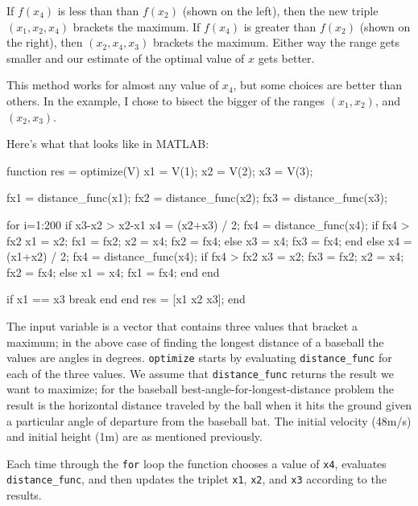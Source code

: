 \documentclass[
]{book}
\numberwithin{Answer}{chapter}
\numberwithin{Exercise}{chapter}
\begin{document}
If $f(x_4)$ is less than than $f(x_2)$ (shown on the left), then the
new triple $(x_1, x_2, x_4)$ brackets the maximum.  If $f(x_4)$ is
greater than $f(x_2)$ (shown on the right), then $(x_2, x_4, x_3)$
brackets the maximum.  Either way the range gets smaller and our
estimate of the optimal value of $x$ gets better.

This method works for almost any value of $x_4$, but some choices
are better than others.  In the example, I chose to bisect the
bigger of the ranges $(x_1, x_2)$, and $(x_2, x_3)$.

Here's what that looks like in MATLAB:

\begin{code}
function res = optimize(V)
    x1 = V(1);
    x2 = V(2);
    x3 = V(3);

    fx1 = distance_func(x1);
    fx2 = distance_func(x2);
    fx3 = distance_func(x3);

    for i=1:200
        if x3-x2 > x2-x1
            x4 = (x2+x3) / 2;
            fx4 = distance_func(x4);
            if fx4 > fx2
                x1 = x2;  fx1 = fx2;
                x2 = x4;  fx2 = fx4;
            else
                x3 = x4;  fx3 = fx4;
            end
        else
            x4 = (x1+x2) / 2;
            fx4 = distance_func(x4);
            if fx4 > fx2
                x3 = x2;  fx3 = fx2;
                x2 = x4;  fx2 = fx4;
            else
                x1 = x4;  fx1 = fx4;
            end
        end

        if x1 == x3
            break
        end
    end
    res = [x1 x2 x3];
end
\end{code}

The input variable is a vector that contains three values that bracket
a maximum; in the above case of finding the longest distance of a baseball 
the values are angles in degrees.  {\tt optimize}
starts by evaluating {\tt distance\_func} for each of the three values.
We assume that {\tt distance\_func} returns the result we want to
maximize; for the baseball best-angle-for-longest-distance problem
the result is the horizontal distance traveled by the
ball when it hits the ground given a particular angle of departure from
the baseball bat.  The initial velocity (48m/s) and initial height (1m) 
are as mentioned previously.

Each time through the {\tt for} loop the function chooses a value
of {\tt x4}, evaluates {\tt distance\_func}, and then updates the
triplet {\tt x1}, {\tt x2}, and {\tt x3} according to the results.
\end{document}
